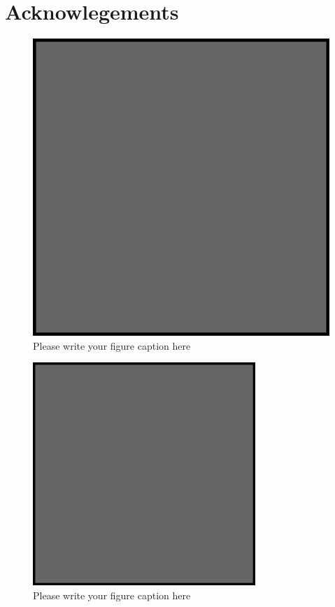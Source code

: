\section*{Acknowlegements}
\begin{figure}
  \includegraphics{example.eps}
\caption{Please write your figure caption here}
\label{fig:1}       %
\end{figure}
%
\begin{figure}
  \includegraphics[width=0.75\textwidth]{example.eps}
\caption{Please write your figure caption here}
\label{fig:2}       %
\end{figure}
